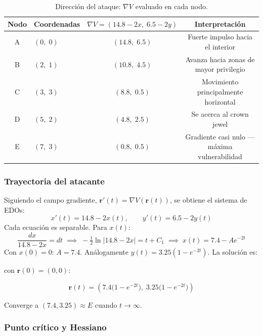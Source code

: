 \documentclass[12pt,a4paper]{article}
\newcommand{\grad}{\nabla}
\begin{document}
\begin{table}[H]
  \centering
  \caption{Dirección del ataque: $\grad V$ evaluado en cada nodo.}
  \begin{tabular}{@{}clcc@{}}
    \toprule
    Nodo & Coordenadas & $\grad V = (14.8-2x,\;6.5-2y)$ & Interpretación \\
    \midrule
    A & $(0,\;0)$   & $(14.8,\;6.5)$  & Fuerte impulso hacia el interior \\
    B & $(2,\;1)$   & $(10.8,\;4.5)$  & Avanza hacia zonas de mayor privilegio \\
    C & $(3,\;3)$   & $(8.8,\;0.5)$   & Movimiento principalmente horizontal \\
    D & $(5,\;2)$   & $(4.8,\;2.5)$   & Se acerca al crown jewel \\
    E & $(7,\;3)$   & $(0.8,\;0.5)$   & Gradiente casi nulo --- máxima vulnerabilidad \\
    \bottomrule
  \end{tabular}
\end{table}

\subsubsection{Trayectoria del atacante}

Siguiendo el campo gradiente, $\mathbf{r}'(t) = \grad V(\mathbf{r}(t))$,
se obtiene el sistema de EDOs:
\begin{equation}
  x'(t) = 14.8 - 2x(t), \qquad y'(t) = 6.5 - 2y(t)
\end{equation}
Cada ecuación es separable. Para $x(t)$:
\begin{equation}
  \frac{dx}{14.8-2x} = dt
  \;\implies\;
  -\tfrac{1}{2}\ln|14.8-2x| = t + C_1
  \;\implies\;
  x(t) = 7.4 - Ae^{-2t}
\end{equation}
Con $x(0)=0$: $A = 7.4$. Análogamente $y(t) = 3.25(1-e^{-2t})$. La solución es:

con $\mathbf{r}(0)=(0,0)$:

\begin{equation}
  \boxed{\mathbf{r}(t) = \left(7.4\bigl(1-e^{-2t}\bigr),\;
  3.25\bigl(1-e^{-2t}\bigr)\right)}
\end{equation}

Converge a $(7.4, 3.25) \approx E$ cuando $t\to\infty$.

\subsubsection{Punto crítico y Hessiano}
\end{document}
